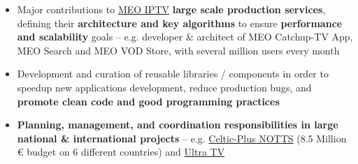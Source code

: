 \documentclass[10pt,a4paper]{altacv}
\begin{document}
  
   
   
      
       

\divider


\begin{itemize}
	\item Major contributions to \href{https://www.meo.pt/tv}{MEO IPTV} \textbf{large scale production services}, defining their \textbf{architecture and key algorithms} to ensure \textbf{performance and scalability} goals -- e.g. developer \& architect of MEO Catchup-TV App, MEO Search and MEO VOD Store, with several million users every month
	\item Development and curation of reusable libraries / components in order to speedup new applications development, reduce production bugs, and \textbf{promote clean code and good programming practices}
	\item \textbf{Planning, management, and coordination responsibilities in large national \& international projects} -- e.g. \href{http://www.alticelabs.com/gapott/}{Celtic-Plus NOTTS} (8.5 Million € budget on 6 different countries) and \href{http://www.alticelabs.com/site/ultratv/}{Ultra TV}
\end{itemize}

                        
    

\clearpage


\end{document}
